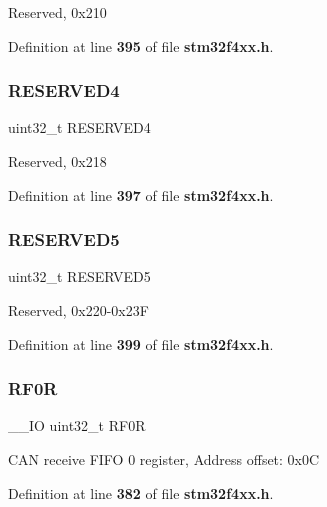 Reserved, 0x210 

Definition at line \textbf{ 395} of file \textbf{ stm32f4xx.\+h}.

\mbox{\label{structCAN__TypeDef_ac0018930ee9f18afda25b695b9a4ec16}} 
\subsubsection{R\+E\+S\+E\+R\+V\+E\+D4}
{\footnotesize\ttfamily uint32\+\_\+t R\+E\+S\+E\+R\+V\+E\+D4}

Reserved, 0x218 

Definition at line \textbf{ 397} of file \textbf{ stm32f4xx.\+h}.

\mbox{\label{structCAN__TypeDef_ad2cc1bcf210515d6f5a416d3f17313c5}} 
\subsubsection{R\+E\+S\+E\+R\+V\+E\+D5}
{\footnotesize\ttfamily uint32\+\_\+t R\+E\+S\+E\+R\+V\+E\+D5}

Reserved, 0x220-\/0x23F 

Definition at line \textbf{ 399} of file \textbf{ stm32f4xx.\+h}.

\mbox{\label{structCAN__TypeDef_accf4141cee239380d0ad4634ee21dbf6}} 
\subsubsection{R\+F0R}
{\footnotesize\ttfamily \+\_\+\+\_\+\+IO uint32\+\_\+t R\+F0R}

C\+AN receive F\+I\+FO 0 register, Address offset\+: 0x0C 

Definition at line \textbf{ 382} of file \textbf{ stm32f4xx.\+h}.

\mbox{\label{structCAN__TypeDef_a02b589bb589df4f39e549dca4d5abb08}} 
